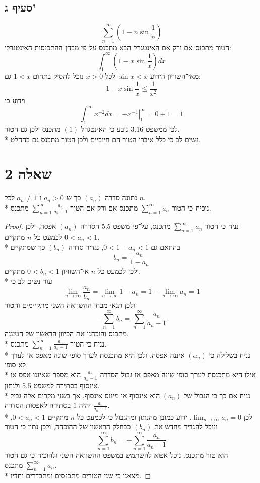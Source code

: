 \subsection{סעיף ג'}
\[
	\sum_{n = 1}^{\infty} \left( 1 - n \sin \frac{1}{n}\right)
\]
הטור מתכנס אם ורק אם האינטגרל הבא מתכנס על־פי מבחן ההתכנסות האינטגרלי:
\[
	\int_{1}^{\infty} \left( 1 - x \sin \frac{1}{x}\right) dx \tag{1}
\]
מאי־השוויון הידוע $\sin x < x$ לכל $x > 0$ נוכל להסיק בתחום $1 < x$ גם:
\[
	 1 - x \sin \frac{1}{x} \le \frac{1}{x^2}
\]
וידוע כי
\[
	\int_{1}^{\infty} x^{-2} dx = \left. -x^{-1} \right|_1^\infty = 0 + 1 = 1
\]
לכן ממשפט 3.16 נובע כי האינטגרל $(1)$ מתכנס ולכן גם הטור. \\*
נשים לב כי כלל איברי הטור הם חיוביים ולכן הטור מתכנס גם בהחלט.

\section{שאלה 2}
נתונה סדרה $(a_n)$ כך ש־$a_n > 0$ ו־$a_n \ne 1$ לכל $n$. \\*
נוכיח כי הטור $\sum_{n = 1}^{\infty} a_n$ מתכנס אם ורק אם הטור $\sum_{n = 1}^{\infty} \frac{a_n}{a_n - 1}$ מתכנס.
\begin{proof}
	נניח כי הטור $\sum_{n = 1}^{\infty} a_n$ מתכנס, על־פי משפט 5.5 הסדרה $(a_n)$ אפסה, ולכן לכמעט כל $n$ מתקיים $0 < a_n < 1$. \\*
	בהתאם גם $0 < 1 - a_n < 1$, נגדיר סדרה $(b_n)$ כך שמתקיים
	\[
		b_n = \frac{a_n}{1 - a_n}
	\]
	ולכן לכמעט כל $n$ אי־השוויון $0 < b_n < 1$ מתקיים. \\*
	עוד נשים לב כי
	\[
		\lim_{n \to \infty} \frac{a_n}{b_n}
		= \lim_{n \to \infty} 1 - a_n
		= 1 - \lim_{n \to \infty} a_n = 1
	\]
	ולכן תנאי מבחן ההשוואה השני מתקיימים והטור
	\[
		- \sum_{n = 1}^{\infty} b_n = \sum_{n = 1}^{\infty} \frac{a_n}{a_n - 1}
	\]
	מתכנס והוכחנו את הכיוון הראשון של הטענה. \\*
	נניח כי הטור $\sum_{n = 1}^{\infty} \frac{a_n}{a_n - 1}$ מתכנס. \\*
	נניח בשלילה כי $(a_n)$ איננה אפסה, ולכן היא מתכנסת לערך סופי שונה מאפס או לערך לא סופי. \\*
	אילו היא מתכנסת לערך סופי שונה מאפס אז גבול הסדרה $\frac{a_n}{a_n - 1}$ הוא מספר שאיננו אפס או אינסוף בסתירה למשפט 5.5 ולנתון. \\*
	נניח אם כך כי הגבול של $(a_n)$ הוא אינסוף או מינוס אינסוף, אך בשני מקרים אלה גבול $\frac{a_n}{a_n - 1}$ יהיה $1$ בסתירה לאפסות הסדרה. \\*
	לכן $\lim_{n \to \infty} a_n = 0$. ידוע כמובן מהנתון ומהגבול כי לכמעט כל $n$ מתקיים $0 < a_n < 1$,
	ונוכל להגדיר מחדש את $(b_n)$ כבחלק הראשון של ההוכחה, ולכן נתון כי הטור
	\[
		\sum_{n = 1}^{\infty} b_n
		= -\sum_{n = 1}^{\infty} \frac{a_n}{a_n - 1}
	\]
	הוא טור מתכנס. נוכל אפוא להשתמש במשפט ההשוואה השני ולהוכיח כי גם הטור $\sum_{n = 1}^{\infty} a_n$ מתכנס. \\*
	מצאנו כי שני הטורים מתכנסים ומתבדרים יחדיו.
\end{proof}

